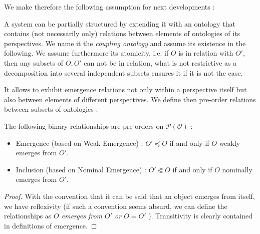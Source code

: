 
We make therefore the following assumption for next developments :
\begin{assumption}
A system can be partially structured by extending it with an ontology that contains (not necessarily only) relations between elements of ontologies of its perspectives. We name it the \emph{coupling ontology} and assume its existence in the following. We assume furthermore its atomicity, i.e. if $O$ is in relation with $O'$, then any subsets of $O,O'$ can not be in relation, what is not restrictive as a decomposition into several independent subsets ensures it if it is not the case.
\end{assumption}

It allows to exhibit emergence relations not only within a perspective itself but also between elements of different perspectives. We define then pre-order relations between subsets of ontologies : %

\begin{proposition}
The following binary relationships are pre-orders on $\mathcal{P(O)}$ :
\begin{itemize}
\item Emergence (based on Weak Emergence) : $O' \preccurlyeq O$ if and only if $O$ weakly emerges from $O'$.
\item Inclusion (based on Nominal Emergence) : $O' \Subset O$ if and only if $O$ nominally emerges from $O'$.
\end{itemize}
\end{proposition}

\begin{proof}
With the convention that it can be said that an object emerges from itself, we have reflexivity (if such a convention seems absurd, we can define the relationships as \emph{$O$ emerges from $O'$ or $O=O'$ }). Transitivity is clearly contained in definitions of emergence.
\end{proof}

\medskip

